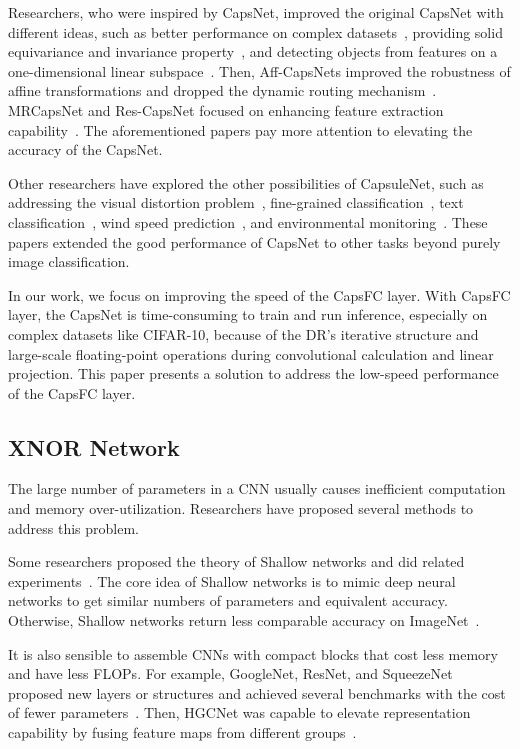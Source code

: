\documentclass[sn-mathphys,iicol,Numbered]{sn-jnl}
\begin{document}
Researchers, who were inspired by CapsNet, improved the original CapsNet with different ideas, such as better performance on complex datasets~\citep{A20_variant_squash}, providing solid equivariance and invariance property~\citep{A21_grp_caps}, and detecting objects from features on a one-dimensional linear subspace~\citep{A22_sp_caps}. Then, Aff-CapsNets improved the robustness of affine transformations and dropped the dynamic routing mechanism~\citep{A24_Rob_Caps}. MRCapsNet and Res-CapsNet focused on enhancing feature extraction capability~\citep{A53_MRCapsNet, A54_Res-CapsNet}. The aforementioned papers pay more attention to elevating the accuracy of the CapsNet.

Other researchers have explored the other possibilities of CapsuleNet, such as addressing the visual distortion problem~\citep{A44_CapsnetSIFT}, fine-grained classification~\citep{A45_fine_grain}, text classification~\citep{A46_textcls}, wind speed prediction~\citep{A55_MOHHO}, and environmental monitoring~\citep{A56_PM25}. These papers extended the good performance of CapsNet to other tasks beyond purely image classification.

In our work, we focus on improving the speed of the CapsFC layer. With CapsFC layer, the CapsNet is time-consuming to train and run inference, especially on complex datasets like CIFAR-10, because of the DR's iterative structure and large-scale floating-point operations during convolutional calculation and linear projection. This paper presents a solution to address the low-speed performance of the CapsFC layer.

\subsection{XNOR Network} \label{sec:2.2}

The large number of parameters in a CNN usually causes inefficient computation and memory over-utilization. Researchers have proposed several methods to address this problem.

Some researchers proposed the theory of Shallow networks and did related experiments~\cite{A29_Cybenko, A30_Seide, A31_Dauphin, A32_Ba}. The core idea of Shallow networks is to mimic deep neural networks to get similar numbers of parameters and equivalent accuracy. Otherwise, Shallow networks return less comparable accuracy on ImageNet~\cite{A31_Dauphin}.

It is also sensible to assemble CNNs with compact blocks that cost less memory and have less FLOPs. For example, GoogleNet, ResNet, and SqueezeNet proposed new layers or structures and achieved several benchmarks with the cost of fewer parameters~\cite{A33_GoogleNet, A19_RES50, A34_SquNet}. Then, HGCNet was capable to elevate representation capability by fusing feature maps from different groups~\cite{A43_high_eff}.
\end{document}

